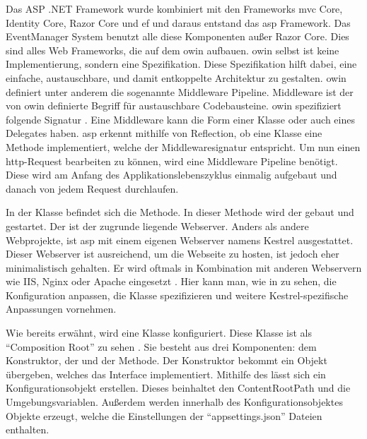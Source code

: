 
Das ASP .NET Framework wurde kombiniert mit den Frameworks \gls{mvc} Core, Identity Core, Razor Core und \gls{ef} und daraus entstand das \gls{asp} Framework. Das EventManager System benutzt alle diese Komponenten außer Razor Core. Dies sind alles Web Frameworks, die auf dem \gls{owin} aufbauen. \gls{owin} selbst ist keine Implementierung, sondern eine Spezifikation. Diese Spezifikation hilft dabei, eine einfache, austauschbare, und damit entkoppelte Architektur zu gestalten. \gls{owin} definiert unter anderem die sogenannte Middleware Pipeline. Middleware ist der von \gls{owin} definierte Begriff für austauschbare Codebausteine. \gls{owin} spezifiziert folgende Signatur . Eine Middleware kann die Form einer Klasse oder auch eines Delegates haben. \gls{asp} erkennt mithilfe von Reflection, ob eine Klasse eine Methode implementiert, welche der Middlewaresignatur entspricht. Um nun einen \gls{http}-Request bearbeiten zu können, wird eine Middleware Pipeline benötigt. Diese wird am Anfang des Applikationslebenszyklus einmalig aufgebaut und danach von jedem Request durchlaufen. \cite{owinKatana}


In der  Klasse befindet sich die  Methode. In dieser Methode wird der  gebaut und gestartet. Der  ist der zugrunde liegende Webserver. Anders als andere Webprojekte, ist \gls{asp} mit einem eigenen Webserver namens Kestrel ausgestattet. Dieser Webserver ist ausreichend, um die Webseite zu hosten, ist jedoch eher minimalistisch gehalten. Er wird oftmals in Kombination mit anderen Webservern wie \zB IIS, Nginx oder Apache eingesetzt \cite{kestrel}. Hier kann man, wie in  zu sehen, die Konfiguration anpassen, die  Klasse spezifizieren und weitere Kestrel-spezifische Anpassungen vornehmen.


Wie bereits erwähnt, wird eine  Klasse konfiguriert. Diese Klasse ist als \enquote{Composition Root} zu sehen \cite{compRoot}. Sie besteht aus drei Komponenten: dem Konstruktor, der  und der  Methode. Der Konstruktor bekommt ein Objekt übergeben, welches das  Interface implementiert. Mithilfe des  lässt sich ein Konfigurationsobjekt erstellen. Dieses beinhaltet den ContentRootPath und die Umgebungsvariablen. Außerdem werden innerhalb des Konfigurationsobjektes  Objekte erzeugt, welche die Einstellungen der \enquote{appsettings.json} Dateien enthalten.

